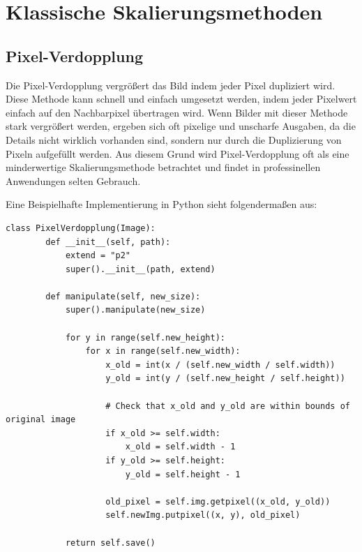\usepackage{amsmath}
\usepackage{amssymb}
\chapter{Klassische Skalierungsmethoden}

    \section{Pixel-Verdopplung}
        Die Pixel-Verdopplung vergrößert das Bild indem jeder Pixel dupliziert wird.
        Diese Methode kann schnell und einfach umgesetzt werden, indem jeder Pixelwert einfach auf den Nachbarpixel übertragen wird. 
        Wenn Bilder mit dieser Methode stark vergrößert werden, ergeben sich oft pixelige und unscharfe Ausgaben, da die Details nicht wirklich vorhanden sind, sondern nur durch die Duplizierung von Pixeln aufgefüllt werden. 
        Aus diesem Grund wird Pixel-Verdopplung oft als eine minderwertige Skalierungsmethode betrachtet und findet in professinellen Anwendungen selten Gebrauch.


    \newpage
    Eine Beispielhafte Implementierung in Python sieht folgendermaßen aus: 
    
    \begin{lstlisting}[caption={Python-Klasse zur Pixelverdopplung und Bildmanipulation: Implementierung des Algorithmus mit der Pillow-Bibliothek und Erklärung des Codes von PixelVerdopplung: \url{https://github.com/studienarbeit-cnn-dhbwka-2022/Code/blob/main/backend/skalierungsmethoden/pixel_verdopplung.py}.}]
    class PixelVerdopplung(Image):
        def __init__(self, path):
            extend = "p2"
            super().__init__(path, extend)
        
        def manipulate(self, new_size):
            super().manipulate(new_size)
        
            for y in range(self.new_height):
                for x in range(self.new_width):
                    x_old = int(x / (self.new_width / self.width))
                    y_old = int(y / (self.new_height / self.height))
        
                    # Check that x_old and y_old are within bounds of original image
                    if x_old >= self.width:
                        x_old = self.width - 1
                    if y_old >= self.height:
                        y_old = self.height - 1
        
                    old_pixel = self.img.getpixel((x_old, y_old))
                    self.newImg.putpixel((x, y), old_pixel)
        
            return self.save()
    \end{lstlisting}
        
